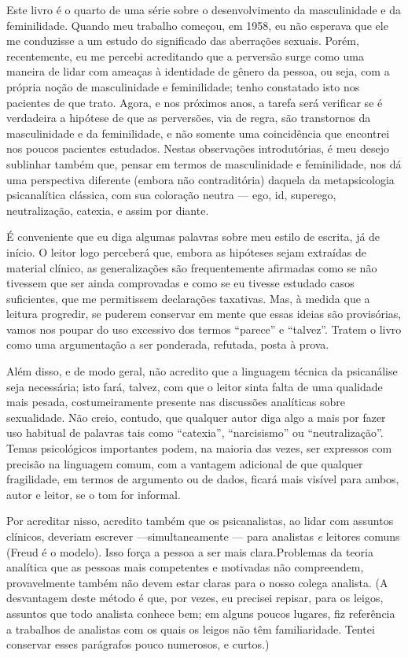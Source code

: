 Este livro é o quarto de uma série sobre o desenvolvimento da
masculinidade e da feminilidade. Quando meu trabalho começou, em 1958,
eu não esperava que ele me conduzisse a um estudo do significado das
aberrações sexuais. Porém, recentemente, eu me percebi acreditando que
a perversão surge como uma maneira de lidar com ameaças à identidade de
gênero\idxiden{} da pessoa, ou seja, com a própria noção de masculinidade e
feminilidade; tenho constatado isto nos pacientes de que trato. Agora,
e nos próximos anos, a tarefa será verificar se é verdadeira a
hipótese de que as perversões, via de regra, são transtornos da
masculinidade e da feminilidade, e não somente uma coincidência que
encontrei nos poucos pacientes estudados. Nestas observações
introdutórias, é meu desejo sublinhar também que, pensar em termos de
masculinidade e feminilidade, nos dá uma perspectiva diferente (embora
não contraditória) daquela da metapsicologia psicanalítica\idxpsica{} clássica,
com sua coloração neutra --- ego, id, superego, neutralização, catexia, e
assim por diante.

É conveniente que eu diga algumas palavras sobre meu estilo de
escrita, já de início. O leitor logo perceberá que, embora as hipóteses
sejam extraídas de material clínico, as generalizações são
frequentemente afirmadas como se não tivessem que ser ainda comprovadas
e como se eu tivesse estudado casos suficientes, que me permitissem
declarações taxativas. Mas, à medida que a leitura progredir, se
puderem conservar em mente que essas ideias são provisórias, vamos
nos poupar do uso excessivo dos termos ``parece'' e
``talvez''. Tratem o livro como uma argumentação a ser ponderada, refutada, posta à prova.

Além disso, e de modo geral, não acredito que a linguagem técnica da
psicanálise seja necessária; isto fará, talvez, com que o leitor sinta
falta de uma qualidade mais pesada, costumeiramente presente nas
discussões analíticas sobre sexualidade. Não creio, contudo, que
qualquer autor diga algo a mais por fazer uso habitual de palavras tais
como ``catexia'', ``narcisismo'' ou ``neutralização''. Temas psicológicos
importantes podem, na maioria das vezes, ser expressos com precisão na
linguagem comum, com a vantagem adicional de que qualquer fragilidade,
em termos de argumento ou de dados, ficará mais visível para ambos,
autor e leitor, se o tom for informal.

Por acreditar nisso, acredito também que os psicanalistas, ao lidar
com assuntos clínicos, deveriam escrever ---simultaneamente --- para
analistas \textit{e} leitores comuns (Freud\idxfreud{} é o modelo). Isso força a
pessoa a ser mais clara.\idxsexop[|(] Problemas da teoria analítica que as pessoas
mais competentes e motivadas não compreendem, provavelmente também não
devem estar claras para o nosso colega analista. (A desvantagem deste
método é que, por vezes, eu precisei repisar, para os leigos, assuntos
que todo analista conhece bem; em alguns poucos lugares, fiz
referência a trabalhos de analistas com os quais os leigos não têm
familiaridade. Tentei conservar esses parágrafos pouco numerosos, e
curtos.)


